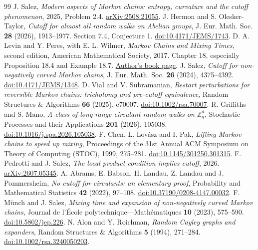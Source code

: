 \documentclass[11pt]{article}
\theoremstyle{remark}\newtheorem{remark}[theorem]{Remark}
\begin{document}
\begingroup\small
\begin{thebibliography}{99}
 J. Salez, \emph{Modern aspects of Markov chains: entropy, curvature and the cutoff phenomenon}, 2025, Problem 2.4.
\href{https://arxiv.org/abs/2508.21055}{arXiv:2508.21055}.
 J. Hermon and S. Olesker-Taylor, \emph{Cutoff for almost all random walks on Abelian groups}, J. Eur. Math. Soc. \textbf{28} (2026), 1913--1977. Section 7.4, Conjecture 1.
\href{https://doi.org/10.4171/JEMS/1743}{doi:10.4171/JEMS/1743}.
 D. A. Levin and Y. Peres, with E. L. Wilmer, \emph{Markov Chains and Mixing Times}, second edition, American Mathematical Society, 2017. Chapter 18, especially Proposition 18.4 and Example 18.7.
\href{https://pages.uoregon.edu/dlevin/MARKOV/}{Author's book page}.
 J. Salez, \emph{Cutoff for non-negatively curved Markov chains}, J. Eur. Math. Soc. \textbf{26} (2024), 4375--4392.
\href{https://doi.org/10.4171/JEMS/1348}{doi:10.4171/JEMS/1348}.
 D. Vial and V. Subramanian, \emph{Restart perturbations for reversible Markov chains: trichotomy and pre-cutoff equivalence}, Random Structures \& Algorithms \textbf{66} (2025), e70007.
\href{https://doi.org/10.1002/rsa.70007}{doi:10.1002/rsa.70007}.
 R. Griffiths and S. Mano, \emph{A class of long range circulant random walks on $\mathbb Z_q^d$}, Stochastic Processes and their Applications \textbf{201} (2026), 105038.
\href{https://doi.org/10.1016/j.spa.2026.105038}{doi:10.1016/j.spa.2026.105038}.
 F. Chen, L. Lov\'asz and I. Pak, \emph{Lifting Markov chains to speed up mixing}, Proceedings of the 31st Annual ACM Symposium on Theory of Computing (STOC), 1999, 275--281.
\href{https://doi.org/10.1145/301250.301315}{doi:10.1145/301250.301315}.
 F. Pedrotti and J. Salez, \emph{The local product condition implies cutoff}, 2026.
\href{https://arxiv.org/abs/2607.05345}{arXiv:2607.05345}.
 A. Abrams, E. Babson, H. Landau, Z. Landau and J. Pommersheim, \emph{No cutoff for circulants: an elementary proof}, Probability and Mathematical Statistics \textbf{42} (2022), 97--108.
\href{https://doi.org/10.37190/0208-4147.00032}{doi:10.37190/0208-4147.00032}.
 F. M\"unch and J. Salez, \emph{Mixing time and expansion of non-negatively curved Markov chains}, Journal de l'\'Ecole polytechnique---Math\'ematiques \textbf{10} (2023), 575--590.
\href{https://doi.org/10.5802/jep.226}{doi:10.5802/jep.226}.
 N. Alon and Y. Roichman, \emph{Random Cayley graphs and expanders}, Random Structures \& Algorithms \textbf{5} (1994), 271--284.
\href{https://doi.org/10.1002/rsa.3240050203}{doi:10.1002/rsa.3240050203}.
\end{thebibliography}\endgroup
\end{document}
